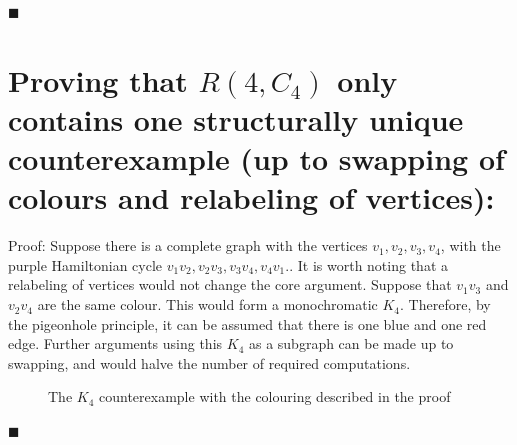 \documentclass{article}
\begin{document}
\hfill$\blacksquare$
\section{Proving that $R(4,C_4)$ only contains one structurally unique counterexample (up to swapping of colours and relabeling of vertices):}
Proof: Suppose there is a complete graph with the vertices $v_1,v_2,v_3,v_4$, with the purple Hamiltonian cycle $v_1v_2,v_2v_3,v_3v_4,v_4v_1.$. It is worth noting that a relabeling of vertices would not change the core argument. Suppose that $v_1v_3$ and $v_2v_4$ are the same colour. This would form a monochromatic $K_4$. Therefore, by the pigeonhole principle, it can be assumed that there is one blue and one red edge. Further arguments using this $K_4$ as a subgraph can be made up to swapping, and would halve the number of required computations.\\

\begin{figure}[h!]
\centering
{}
\caption{The $K_4$ counterexample with the colouring described in the proof}
\end{figure}
\hfill$\blacksquare$
\end{document}
